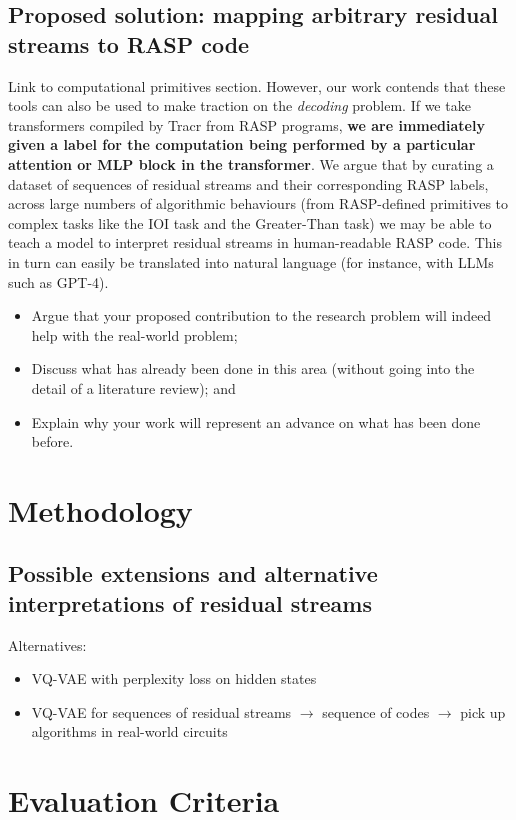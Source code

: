 \documentclass[11pt]{scrartcl}
\begin{document}
\subsection{Proposed solution: mapping arbitrary residual streams to RASP code}
\color{blue} Link to computational primitives section.\color{black} However, our work contends that these tools can also be used to make traction on the \textit{decoding} problem. If we take transformers compiled by Tracr from RASP programs, \textbf{we are immediately given a label for the computation being performed by a particular attention or MLP block in the transformer}. We argue that by curating a dataset of sequences of residual streams and their corresponding RASP labels, across large numbers of algorithmic behaviours (from RASP-defined primitives to complex tasks like the IOI task and the Greater-Than task) we may be able to teach a model to interpret residual streams in human-readable RASP code. This in turn can easily be translated into natural language (for instance, with LLMs such as GPT-4). 

\color{blue}
\begin{itemize}
\item Argue that your proposed contribution to the research problem will indeed
help with the real-world problem;
\item Discuss what has already been done in this area (without going into the detail of a literature review); and
\item Explain why your work will represent an advance on what has been done
before.
\end{itemize}
\color{black}

\section{Methodology}

\subsection{Possible extensions and alternative interpretations of residual streams}

\color{blue}
Alternatives:
\begin{itemize}
\item VQ-VAE with perplexity loss on hidden states
\item VQ-VAE for sequences of residual streams $\rightarrow$ sequence of codes $\rightarrow$ pick up algorithms in real-world circuits
\end{itemize}
\color{black}

\section{Evaluation Criteria}

\printbibliography %
\end{document}
